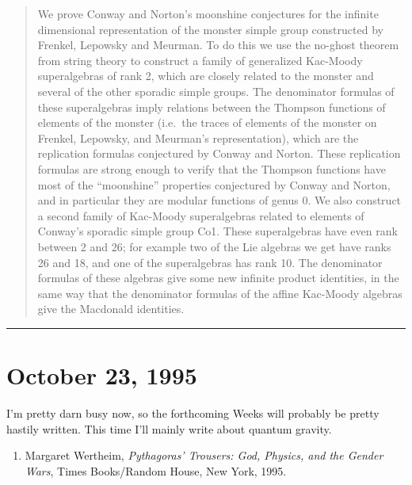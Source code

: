 \documentclass{article}
\def\tightlist{}
\begin{document}
\begin{quote}
We prove Conway and Norton's moonshine conjectures for the infinite
dimensional representation of the monster simple group constructed by
Frenkel, Lepowsky and Meurman. To do this we use the no-ghost theorem
from string theory to construct a family of generalized Kac-Moody
superalgebras of rank 2, which are closely related to the monster and
several of the other sporadic simple groups. The denominator formulas of
these superalgebras imply relations between the Thompson functions of
elements of the monster (i.e.~the traces of elements of the monster on
Frenkel, Lepowsky, and Meurman's representation), which are the
replication formulas conjectured by Conway and Norton. These replication
formulas are strong enough to verify that the Thompson functions have
most of the ``moonshine'' properties conjectured by Conway and Norton,
and in particular they are modular functions of genus 0. We also
construct a second family of Kac-Moody superalgebras related to elements
of Conway's sporadic simple group Co1. These superalgebras have even
rank between 2 and 26; for example two of the Lie algebras we get have
ranks 26 and 18, and one of the superalgebras has rank 10. The
denominator formulas of these algebras give some new infinite product
identities, in the same way that the denominator formulas of the affine
Kac-Moody algebras give the Macdonald identities.
\end{quote}

\begin{center}\rule{0.5\linewidth}{0.5pt}\end{center}



\hypertarget{week67}{%
\section{October 23, 1995}\label{week67}}

I'm pretty darn busy now, so the forthcoming Weeks will probably be
pretty hastily written. This time I'll mainly write about quantum
gravity.

\begin{enumerate}
\def\labelenumi{\arabic{enumi})}
\tightlist
\item
  Margaret Wertheim, \emph{Pythagoras' Trousers: God, Physics, and the
  Gender Wars}, Times Books/Random House, New York, 1995.
\end{enumerate}
\end{document}

